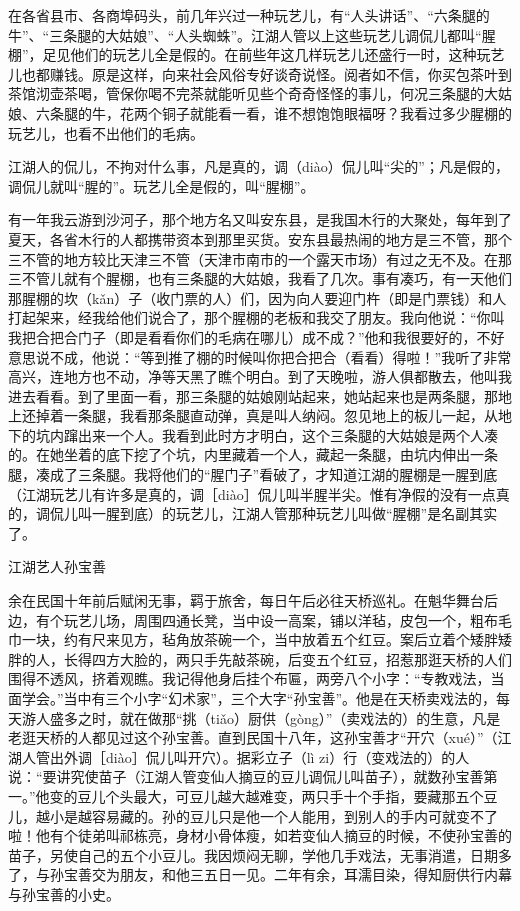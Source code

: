 \documentclass[12pt,UTF8]{ctexbook}
\begin{document}
在各省县市、各商埠码头，前几年兴过一种玩艺儿，有“人头讲话”、“六条腿的牛”、“三条腿的大姑娘”、“人头蜘蛛”。江湖人管以上这些玩艺儿调侃儿都叫“腥棚”，足见他们的玩艺儿全是假的。在前些年这几样玩艺儿还盛行一时，这种玩艺儿也都赚钱。原是这样，向来社会风俗专好谈奇说怪。阅者如不信，你买包茶叶到茶馆沏壶茶喝，管保你喝不完茶就能听见些个奇奇怪怪的事儿，何况三条腿的大姑娘、六条腿的牛，花两个铜子就能看一看，谁不想饱饱眼福呀？我看过多少腥棚的玩艺儿，也看不出他们的毛病。

江湖人的侃儿，不拘对什么事，凡是真的，调（diào）侃儿叫“尖的”；凡是假的，调侃儿就叫“腥的”。玩艺儿全是假的，叫“腥棚”。



有一年我云游到沙河子，那个地方名又叫安东县，是我国木行的大聚处，每年到了夏天，各省木行的人都携带资本到那里买货。安东县最热闹的地方是三不管，那个三不管的地方较比天津三不管（天津市南市的一个露天市场）有过之无不及。在那三不管儿就有个腥棚，也有三条腿的大姑娘，我看了几次。事有凑巧，有一天他们那腥棚的坎（kǎn）子（收门票的人）们，因为向人要迎门杵（即是门票钱）和人打起架来，经我给他们说合了，那个腥棚的老板和我交了朋友。我向他说：“你叫我把合把合门子（即是看看你们的毛病在哪儿）成不成？”他和我很要好的，不好意思说不成，他说：“等到推了棚的时候叫你把合把合（看看）得啦！”我听了非常高兴，连地方也不动，净等天黑了瞧个明白。到了天晚啦，游人俱都散去，他叫我进去看看。到了里面一看，那三条腿的姑娘刚站起来，她站起来也是两条腿，那地上还掉着一条腿，我看那条腿直动弹，真是叫人纳闷。忽见地上的板儿一起，从地下的坑内蹿出来一个人。我看到此时方才明白，这个三条腿的大姑娘是两个人凑的。在她坐着的底下挖了个坑，内里藏着一个人，藏起一条腿，由坑内伸出一条腿，凑成了三条腿。我将他们的“腥门子”看破了，才知道江湖的腥棚是一腥到底（江湖玩艺儿有许多是真的，调［diào］侃儿叫半腥半尖。惟有净假的没有一点真的，调侃儿叫一腥到底）的玩艺儿，江湖人管那种玩艺儿叫做“腥棚”是名副其实了。





江湖艺人孙宝善


余在民国十年前后赋闲无事，羁于旅舍，每日午后必往天桥巡礼。在魁华舞台后边，有个玩艺儿场，周围四通长凳，当中设一高案，铺以洋毡，皮包一个，粗布毛巾一块，约有尺来见方，毡角放茶碗一个，当中放着五个红豆。案后立着个矮胖矮胖的人，长得四方大脸的，两只手先敲茶碗，后变五个红豆，招惹那逛天桥的人们围得不透风，挤着观瞧。我记得他身后挂个布匾，两旁八个小字：“专教戏法，当面学会。”当中有三个小字“幻术家”，三个大字“孙宝善”。他是在天桥卖戏法的，每天游人盛多之时，就在做那“挑（tiǎo）厨供（gòng）”（卖戏法的）的生意，凡是老逛天桥的人都见过这个孙宝善。直到民国十八年，这孙宝善才“开穴（xué）”（江湖人管出外调［diào］侃儿叫开穴）。据彩立子（lì zi）行（变戏法的）的人说：“要讲究使苗子（江湖人管变仙人摘豆的豆儿调侃儿叫苗子），就数孙宝善第一。”他变的豆儿个头最大，可豆儿越大越难变，两只手十个手指，要藏那五个豆儿，越小是越容易藏的。孙的豆儿只是他一个人能用，到别人的手内可就变不了啦！他有个徒弟叫祁栋亮，身材小骨体瘦，如若变仙人摘豆的时候，不使孙宝善的苗子，另使自己的五个小豆儿。我因烦闷无聊，学他几手戏法，无事消遣，日期多了，与孙宝善交为朋友，和他三五日一见。二年有余，耳濡目染，得知厨供行内幕与孙宝善的小史。
\end{document}
